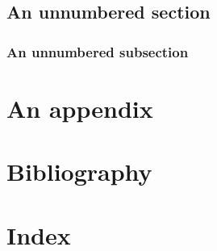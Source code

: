 \documentclass[11pt, a4paper]{book}
\begin{document}
	\lipsum[1]
	
	
	\section*{An unnumbered section}
	
		\lipsum[2]
		
		
		\subsection*{An unnumbered subsection}
		
			\lipsum[3]


\appendix
\chapter{An appendix}

	\lipsum



\backmatter

\chapter{Bibliography}

	\lipsum[1]


\chapter{Index}

	\lipsum[1]


\end{document}

